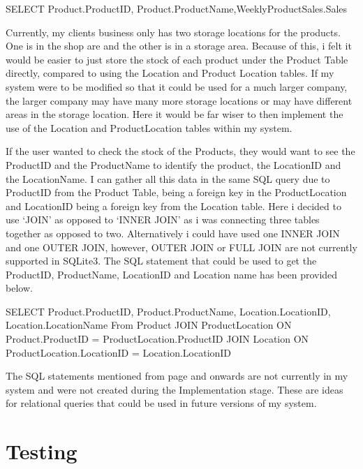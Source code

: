 \begin{sql}
SELECT Product.ProductID, Product.ProductName,WeeklyProductSales.Sales
\end{sql}

Currently, my clients business only has two storage locations for the products. One is in the shop are and the other is in a storage area. Because of this, i felt it would be easier to just store the stock of each product under the Product Table directly, compared to using the Location and Product Location tables. If my system were to be modified so that it could be used for a much larger company, the larger company may have many more storage locations or may have different areas in the storage location. Here it would be far wiser to then implement the use of the Location and ProductLocation tables within my system. 

If the user wanted to check the stock of the Products, they would want to see the ProductID and the ProductName to identify the product, the LocationID and the LocationName. I can gather all this data in the same SQL query due to ProductID from the Product Table, being a foreign key in the ProductLocation and LocationID being a foreign key from the Location table. Here i decided to use `JOIN' as opposed to `INNER JOIN' as i was connecting three tables together as opposed to two. Alternatively i could have used one INNER JOIN and one OUTER JOIN, however, OUTER JOIN or FULL JOIN are not currently supported in SQLite3. The SQL statement that could be used to get the ProductID, ProductName, LocationID and Location name has been provided below.

\begin{sql}
SELECT Product.ProductID, Product.ProductName, Location.LocationID, Location.LocationName
From Product 
JOIN ProductLocation ON Product.ProductID = ProductLocation.ProductID
JOIN Location ON ProductLocation.LocationID = Location.LocationID
\end{sql}

The SQL statements mentioned from page \pageref{fig:improvements-sql}and onwards are not currently in my system and were not created during the Implementation stage. These are ideas for relational queries that could be used in future versions of my system.

\pagebreak 

\section{Testing}

